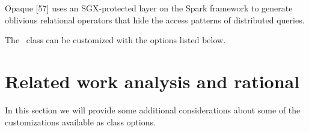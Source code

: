 Opaque [57] uses an SGX-protected layer on the Spark
framework to generate oblivious relational operators that
hide the access patterns of distributed queries.

The \novathesis\ class can be customized with the options listed below.



\section{Related work analysis and rational} %
\label{sec:additional_considerations}

In this section we will provide some additional considerations about some of the customizations available as class options.



